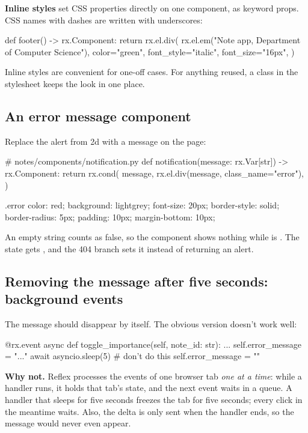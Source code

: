 \textbf{Inline styles} set CSS properties directly on one component, as keyword props. CSS names with dashes are written with underscores:

\begin{py}
def footer() -> rx.Component:
	return rx.el.div(
		rx.el.em("Note app, Department of Computer Science"),
		color="green",
		font_style="italic",
		font_size="16px",
	)
\end{py}

Inline styles are convenient for one-off cases. For anything reused, a class in the stylesheet keeps the look in one place.

\subsection{An error message component}

Replace the alert from 2d with a message on the page:

\begin{py}
# notes/components/notification.py
def notification(message: rx.Var[str]) -> rx.Component:
	return rx.cond(
		message,
		rx.el.div(message, class_name="error"),
	)
\end{py}

\begin{code}
.error {
    color: red;
    background: lightgrey;
    font-size: 20px;
    border-style: solid;
    border-radius: 5px;
    padding: 10px;
    margin-bottom: 10px;
}
\end{code}

An empty string counts as false, so the component shows nothing while  is . The state gets , and the 404 branch sets it instead of returning an alert.

\subsection{Removing the message after five seconds: background events}

The message should disappear by itself. The obvious version doesn't work well:

\begin{py}
@rx.event
async def toggle_importance(self, note_id: str):
	...
	self.error_message = "..."
	await asyncio.sleep(5)          # don't do this
	self.error_message = ""
\end{py}

\textbf{Why not.} Reflex processes the events of one browser tab \emph{one at a time}: while a handler runs, it holds that tab's state, and the next event waits in a queue. A handler that sleeps for five seconds freezes the tab for five seconds; every click in the meantime waits. Also, the delta is only sent when the handler ends, so the message would never even appear.

